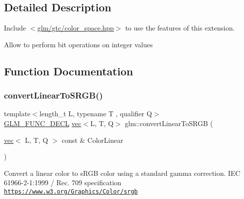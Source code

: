 \subsection{Detailed Description}
Include $<$\hyperlink{gtc_2color__space_8hpp}{glm/gtc/color\+\_\+space.\+hpp}$>$ to use the features of this extension.

Allow to perform bit operations on integer values 

\subsection{Function Documentation}
\mbox{\label{group__gtc__color__space_ga42239e7b3da900f7ef37cec7e2476579}} 
\subsubsection{\texorpdfstring{convert\+Linear\+To\+S\+R\+G\+B()}{convertLinearToSRGB()}\hspace{0.1cm}{\footnotesize\ttfamily [1/2]}}
{\footnotesize\ttfamily template$<$length\+\_\+t L, typename T , qualifier Q$>$ \\
\hyperlink{setup_8hpp_ab2d052de21a70539923e9bcbf6e83a51}{G\+L\+M\+\_\+\+F\+U\+N\+C\+\_\+\+D\+E\+CL} \hyperlink{structglm_1_1vec}{vec}$<$L, T, Q$>$ glm\+::convert\+Linear\+To\+S\+R\+GB (\begin{DoxyParamCaption}\item[{\hyperlink{structglm_1_1vec}{vec}$<$ L, T, Q $>$ const \&}]{Color\+Linear }\end{DoxyParamCaption})}

Convert a linear color to s\+R\+GB color using a standard gamma correction. I\+EC 61966-\/2-\/1\+:1999 / Rec. 709 specification \href{https://www.w3.org/Graphics/Color/srgb}{\tt https\+://www.\+w3.\+org/\+Graphics/\+Color/srgb} \mbox{\label{group__gtc__color__space_gaace0a21167d13d26116c283009af57f6}} 
